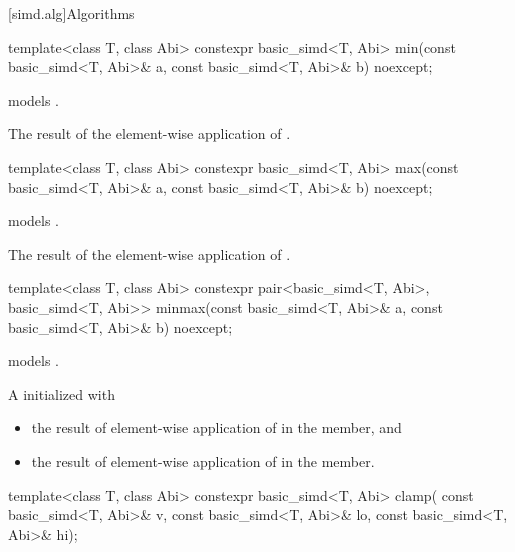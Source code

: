 [simd.alg]{Algorithms}

\begin{itemdecl}
template<class T, class Abi>
  constexpr basic_simd<T, Abi> min(const basic_simd<T, Abi>& a, const basic_simd<T, Abi>& b) noexcept;
\end{itemdecl}

\begin{itemdescr}
  \pnum\constraints
   models .

  \pnum\returns
  The result of the element-wise application of  \foralli.
\end{itemdescr}

\begin{itemdecl}
template<class T, class Abi>
  constexpr basic_simd<T, Abi> max(const basic_simd<T, Abi>& a, const basic_simd<T, Abi>& b) noexcept;
\end{itemdecl}

\begin{itemdescr}
  \pnum\constraints
   models .

  \pnum\returns
  The result of the element-wise application of  \foralli.
\end{itemdescr}

\begin{itemdecl}
template<class T, class Abi>
  constexpr pair<basic_simd<T, Abi>, basic_simd<T, Abi>>
  minmax(const basic_simd<T, Abi>& a, const basic_simd<T, Abi>& b) noexcept;
\end{itemdecl}

\begin{itemdescr}
  \pnum\constraints
   models .

  \pnum\returns
  A  initialized with
  \begin{itemize}
    \item the result of element-wise application of  \foralli{} in the  member, and
    \item the result of element-wise application of  \foralli{} in the  member.
  \end{itemize}
\end{itemdescr}

\begin{itemdecl}
template<class T, class Abi>
  constexpr basic_simd<T, Abi> clamp(
    const basic_simd<T, Abi>& v, const basic_simd<T, Abi>& lo, const basic_simd<T, Abi>& hi);
\end{itemdecl}

